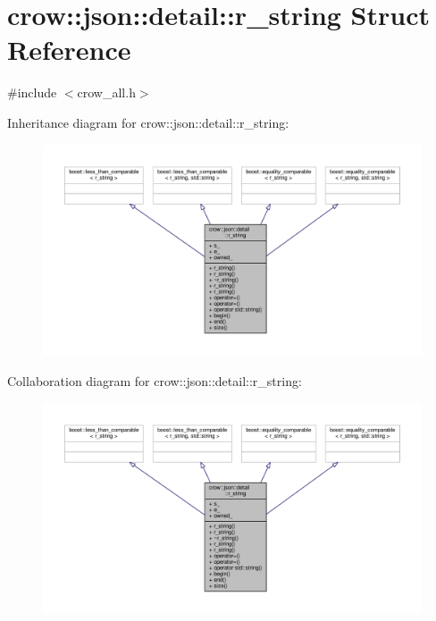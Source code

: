 \hypertarget{structcrow_1_1json_1_1detail_1_1r__string}{\section{crow\-:\-:json\-:\-:detail\-:\-:r\-\_\-string Struct Reference}
\label{structcrow_1_1json_1_1detail_1_1r__string}
}


{\ttfamily \#include $<$crow\-\_\-all.\-h$>$}



Inheritance diagram for crow\-:\-:json\-:\-:detail\-:\-:r\-\_\-string\-:
\nopagebreak
\begin{figure}[H]
\begin{center}
\leavevmode
\includegraphics[width=350pt]{structcrow_1_1json_1_1detail_1_1r__string__inherit__graph}
\end{center}
\end{figure}


Collaboration diagram for crow\-:\-:json\-:\-:detail\-:\-:r\-\_\-string\-:
\nopagebreak
\begin{figure}[H]
\begin{center}
\leavevmode
\includegraphics[width=350pt]{structcrow_1_1json_1_1detail_1_1r__string__coll__graph}
\end{center}
\end{figure}

